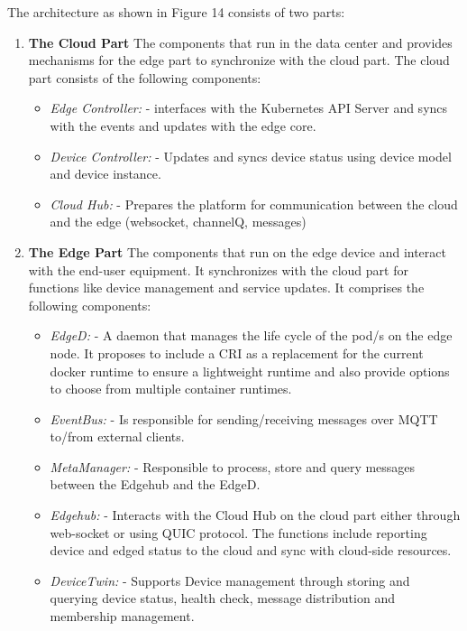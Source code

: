 \begin{flushleft}
The architecture as shown in Figure 14 consists of two parts:
\end{flushleft}
\begin{enumerate}
    \item \textbf{The Cloud Part}
	    The components that run in the data center and provides mechanisms for the edge part to synchronize with the cloud part. The cloud part consists of the following components:
        \begin{itemize}
            \item \textit{Edge Controller:} - interfaces with the Kubernetes API Server and syncs with the events and updates with the edge core.
            \item \textit{Device Controller:} - Updates and syncs device status using device model and device instance. 
            \item \textit{Cloud Hub:} - Prepares the platform for communication between the cloud and the edge (websocket, channelQ, messages)
		\end{itemize}
    \item \textbf{The Edge Part}
        The components that run on the edge device and interact with the end-user equipment. It synchronizes with the cloud part for functions like device management and service updates. It comprises the following components:
		\begin{itemize}
            \item \textit{EdgeD:} - A daemon that manages the life cycle of the pod/s on the edge node. It proposes to include a CRI as a replacement for the current docker runtime to ensure a lightweight runtime and also provide options to choose from multiple container runtimes.
            \item \textit{EventBus:} - Is responsible for sending/receiving messages over MQTT to/from external clients.
            \item \textit{MetaManager:} - Responsible to process, store and query messages between the Edgehub and the EdgeD. 
            \item \textit{Edgehub:} - Interacts with the Cloud Hub on the cloud part either through web-socket or using QUIC protocol. The functions include reporting device and edged status to the cloud and sync with cloud-side resources.
            \item \textit{DeviceTwin:} - Supports Device management through storing and querying device status, health check, message distribution and membership management.
	    \end{itemize}
\end{enumerate}
